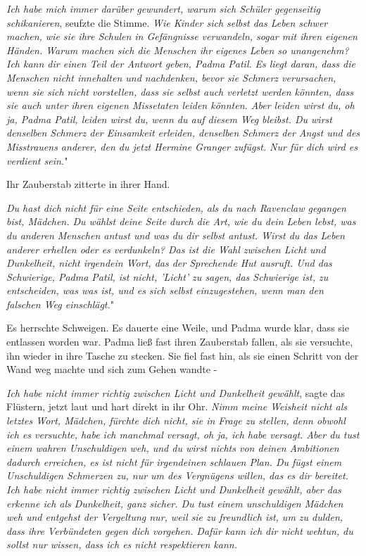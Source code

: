 \glqq \emph{Ich habe mich immer darüber gewundert, warum sich Schüler
gegenseitig schikanieren}\grqq{}, seufzte die Stimme. \glqq \emph{Wie Kinder
sich selbst das Leben schwer machen, wie sie ihre Schulen in Gefängnisse
verwandeln, sogar mit ihren eigenen Händen. Warum machen sich die Menschen ihr
eigenes Leben so unangenehm? Ich kann dir einen Teil der Antwort geben, Padma
Patil. }\emph{ Es liegt daran, dass die Menschen nicht innehalten und
nachdenken, bevor sie Schmerz verursachen, wenn sie sich nicht vorstellen, dass
sie selbst auch verletzt werden könnten, dass sie auch unter ihren eigenen
Missetaten leiden könnten. Aber leiden wirst du, oh ja, Padma Patil, leiden
wirst du, wenn du auf diesem Weg bleibst. Du wirst denselben Schmerz der
Einsamkeit erleiden, denselben Schmerz der Angst und des Misstrauens anderer,
den du jetzt Hermine Granger zufügst. Nur für dich wird es verdient sein.}"

Ihr Zauberstab zitterte in ihrer Hand.

\glqq \emph{Du hast dich nicht für eine Seite entschieden, als du nach Ravenclaw
gegangen bist, Mädchen. Du wählst deine Seite durch die Art, wie du dein Leben
lebst, was du anderen Menschen antust und was du dir selbst antust. Wirst du das
Leben anderer erhellen oder es verdunkeln? Das ist die Wahl zwischen Licht und
Dunkelheit, nicht irgendein Wort, das der Sprechende Hut ausruft. Und das
Schwierige, Padma Patil, ist nicht, 'Licht' zu sagen, das Schwierige ist, zu
entscheiden, was was ist, und es sich selbst einzugestehen, wenn man den
falschen Weg einschlägt.}"

Es herrschte Schweigen. Es dauerte eine Weile, und Padma wurde klar, dass sie
entlassen worden war. Padma ließ fast ihren Zauberstab fallen, als sie
versuchte, ihn wieder in ihre Tasche zu stecken. Sie fiel fast hin, als sie
einen Schritt von der Wand weg machte und sich zum Gehen wandte -

\glqq \emph{Ich habe nicht immer richtig zwischen Licht und Dunkelheit
gewählt}\grqq{}, sagte das Flüstern, jetzt laut und hart direkt in ihr Ohr.
\glqq \emph{Nimm meine Weisheit nicht als letztes Wort, Mädchen, fürchte dich
nicht, sie in Frage zu stellen, denn obwohl ich es versuchte, habe ich manchmal
versagt, oh ja, ich habe versagt. Aber du tust einem wahren Unschuldigen weh,
und du wirst nichts von deinen Ambitionen dadurch erreichen, es ist nicht für
irgendeinen schlauen Plan. Du fügst einem Unschuldigen Schmerzen zu, nur um des
Vergnügens willen, das es dir bereitet. Ich habe nicht immer richtig zwischen
Licht und Dunkelheit gewählt, aber das erkenne ich als Dunkelheit, ganz sicher.
Du tust einem unschuldigen Mädchen weh und entgehst der Vergeltung nur, weil sie
zu freundlich ist, um zu dulden, dass ihre Verbündeten gegen dich vorgehen.
Dafür kann ich dir nicht wehtun, du sollst nur wissen, dass ich es nicht
respektieren kann.}

